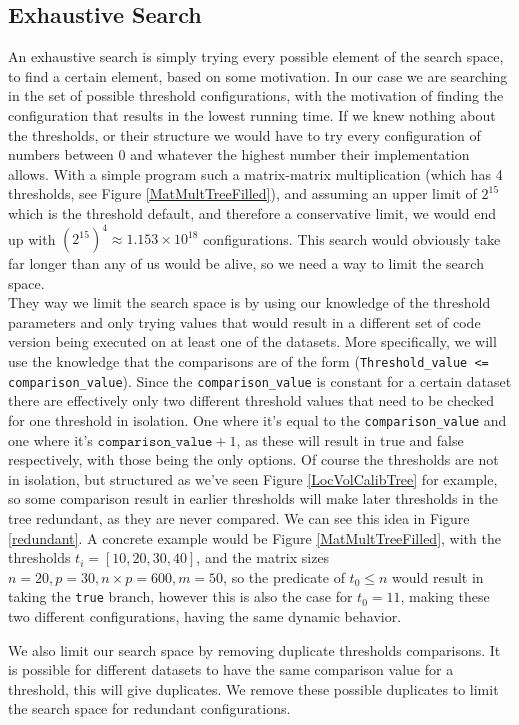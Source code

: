 \subsection{Exhaustive Search}
An exhaustive search is simply trying every possible element of the search space, 
to find a certain element, based on some motivation. In our case we are searching in the set of possible 
threshold configurations, with the motivation of finding the configuration that results in the lowest running time. If we knew nothing about
the thresholds, or their structure we would have to try every configuration of
numbers between 0 and whatever the highest number their implementation allows. 
With a simple program such a matrix-matrix multiplication (which has 4 thresholds, see Figure \ref{MatMultTreeFilled}), and assuming an upper limit of $2^{15}$ which is the threshold default, and therefore a conservative limit,
we would end up with $\left(2^{15}\right)^4 \approx 1.153\times10^{18}$ configurations.
This search would obviously take far longer than any of us would be alive, so we need a way to limit the search space.
\\
They way we limit the search space is by using our knowledge of the threshold
parameters and only trying values that would result in a different set of code 
version being executed on at least one of the datasets. More specifically, we will
use the knowledge that the comparisons are of the form
(\texttt{Threshold\_value <= comparison\_value}). Since the
\texttt{comparison\_value} is constant for a certain dataset there are effectively
only two different threshold values that need to be checked for one threshold 
in isolation. One where it's equal to the \texttt{comparison\_value} and one
where it's $\texttt{comparison\_value} + 1$, as these will result in true and
false respectively, with those being the only options.
Of course the thresholds are not in isolation, but structured as we've seen
Figure \ref{LocVolCalibTree} for example, so some comparison result in earlier 
thresholds will make later thresholds in the tree redundant, as they are never compared. We can see this idea in Figure \ref{redundant}. A concrete example would be Figure \ref{MatMultTreeFilled}, with the thresholds $t_i = [10, 20, 30, 40]$, and the matrix sizes $n=20, p=30, n\times p=600, m=50$, so the predicate of $t_0 \leq n$ would result in taking the \texttt{true} branch, however this is also the case for $t_0 = 11$, making these two different configurations, having the same dynamic behavior.

We also limit our search space by removing duplicate thresholds comparisons. It is possible for different datasets to have the same comparison value for a threshold, this will give duplicates. We remove these possible duplicates to limit the search space for redundant configurations.
